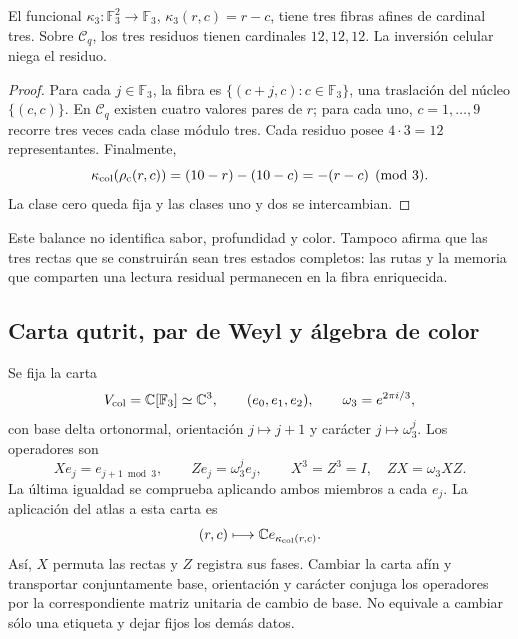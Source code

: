 \begin{proposition}
\label{hmtcuatro:color:balance}
El funcional \(\kappa_3:\mathbb F_3^2\to\mathbb F_3\),
\(\kappa_3(r,c)=r-c\), tiene tres fibras afines de cardinal tres.
Sobre \(\mathcal C_q\), los tres residuos tienen cardinales
\(12,12,12\). La inversión celular niega el residuo.
\end{proposition}
\begin{proof}
Para cada \(j\in\mathbb F_3\), la fibra es
\(\{(c+j,c):c\in\mathbb F_3\}\), una traslación del núcleo
\(\{(c,c)\}\). En \(\mathcal C_q\) existen cuatro valores pares
de \(r\); para cada uno, \(c=1,\ldots,9\) recorre tres veces
cada clase módulo tres. Cada residuo posee \(4\cdot3=12\)
representantes. Finalmente,
\[
 \kappa_{\rm col}(\rho_{\rm c}(r,c))
 =(10-r)-(10-c)=-(r-c)\pmod3.
\]
La clase cero queda fija y las clases uno y dos se intercambian.
\end{proof}

Este balance no identifica sabor, profundidad y color. Tampoco afirma
que las tres rectas que se construirán sean tres estados completos:
las rutas y la memoria que comparten una lectura residual permanecen
en la fibra enriquecida.

\subsection{Carta qutrit, par de Weyl y álgebra de color}
\label{hmtcuatro:color:weyl}

Se fija la carta
\[
 V_{\rm col}=\mathbb C[\mathbb F_3]\simeq\mathbb C^3,
 \qquad (e_0,e_1,e_2),\qquad
 \omega_3=e^{2\pi i/3},
\]
con base delta ortonormal, orientación \(j\mapsto j+1\) y carácter
\(j\mapsto\omega_3^j\). Los operadores son
\[
 Xe_j=e_{j+1\bmod3},\qquad Ze_j=\omega_3^j e_j,
 \qquad X^3=Z^3=I,\quad ZX=\omega_3XZ.
\]
La última igualdad se comprueba aplicando ambos miembros a cada
\(e_j\). La aplicación del atlas a esta carta es
\[
 (r,c)\longmapsto\mathbb C e_{\kappa_{\rm col}(r,c)}.
\]
Así, \(X\) permuta las rectas y \(Z\) registra sus fases. Cambiar
la carta afín y transportar conjuntamente base, orientación y carácter
conjuga los operadores por la correspondiente matriz unitaria de
cambio de base. No equivale a cambiar sólo una etiqueta y dejar fijos
los demás datos.

